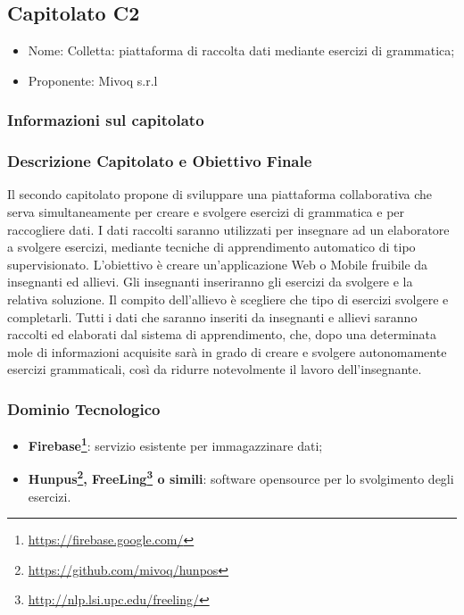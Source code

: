 \subsection{Capitolato C2}
\begin{itemize}
	\item Nome: Colletta: piattaforma di raccolta dati mediante esercizi di grammatica;
	\item Proponente: Mivoq s.r.l
\end{itemize}

\subsubsection{Informazioni sul capitolato}

\subsubsection{Descrizione Capitolato e Obiettivo Finale}
Il secondo capitolato propone di sviluppare una piattaforma collaborativa che serva simultaneamente per 
creare e svolgere esercizi di grammatica e per raccogliere dati.
I dati raccolti saranno utilizzati per insegnare ad un elaboratore a svolgere esercizi, mediante tecniche di apprendimento automatico di tipo supervisionato.
L'obiettivo è creare un'applicazione Web o Mobile fruibile da insegnanti ed allievi. Gli insegnanti inseriranno gli esercizi da svolgere e la relativa soluzione. Il compito dell'allievo è scegliere che tipo di esercizi svolgere e completarli. Tutti i dati che saranno inseriti da insegnanti e allievi saranno raccolti ed elaborati dal sistema di apprendimento, che, dopo una determinata mole di informazioni acquisite sarà in grado di creare e svolgere autonomamente esercizi grammaticali, così da ridurre notevolmente il lavoro dell'insegnante.

\subsubsection{Dominio Tecnologico}
\begin{itemize}
	\item \textbf{Firebase\footnote{\hyperref[Link al sito]{https://firebase.google.com/}}}: servizio esistente per immagazzinare dati;
	\item \textbf{Hunpus\footnote{\hyperref[Link al sito]{https://github.com/mivoq/hunpos}}, FreeLing\footnote{\hyperref[Link al sito]{http://nlp.lsi.upc.edu/freeling/}} o simili}: software opensource per lo svolgimento degli esercizi. 
\end{itemize}

